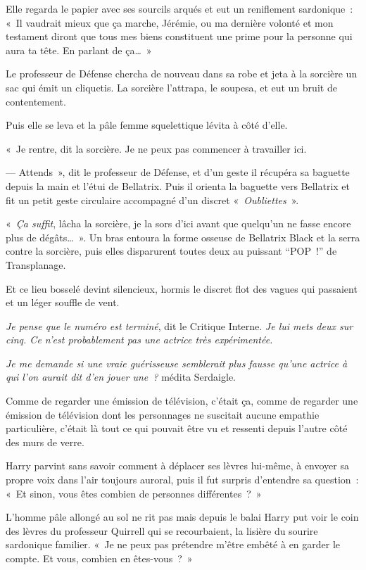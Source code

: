 Elle regarda le papier avec ses sourcils arqués et eut un reniflement sardonique~: «~Il vaudrait mieux que ça marche, Jérémie, ou ma dernière volonté et mon testament diront que tous mes biens constituent une prime pour la personne qui aura ta tête. En parlant de ça…~»

Le professeur de Défense chercha de nouveau dans sa robe et jeta à la sorcière un sac qui émit un cliquetis. La sorcière l'attrapa, le soupesa, et eut un bruit de contentement.

Puis elle se leva et la pâle femme squelettique lévita à côté d'elle.

«~Je rentre, dit la sorcière. Je ne peux pas commencer à travailler ici.

--- Attends~», dit le professeur de Défense, et d'un geste il récupéra sa baguette depuis la main et l'étui de Bellatrix. Puis il orienta la baguette vers Bellatrix et fit un petit geste circulaire accompagné d'un discret «~\emph{Oubliettes}~».

«~\emph{Ça suffit}, lâcha la sorcière, je la sors d'ici avant que quelqu'un ne fasse encore plus de dégâts…~». Un bras entoura la forme osseuse de Bellatrix Black et la serra contre la sorcière, puis elles disparurent toutes deux au puissant “POP~!” de Transplanage.

Et ce lieu bosselé devint silencieux, hormis le discret flot des vagues qui passaient et un léger souffle de vent.

\emph{Je pense que le numéro est terminé}, dit le Critique Interne. \emph{Je lui mets deux sur cinq. Ce n'est probablement pas une actrice très expérimentée.}

\emph{Je me demande si une vraie guérisseuse semblerait plus fausse qu'une actrice à qui l'on aurait dit d'en jouer une~?} médita Serdaigle.

Comme de regarder une émission de télévision, c'était ça, comme de regarder une émission de télévision dont les personnages ne suscitait aucune empathie particulière, c'était là tout ce qui pouvait être vu et ressenti depuis l'autre côté des murs de verre.

Harry parvint sans savoir comment à déplacer ses lèvres lui-même, à envoyer sa propre voix dans l'air toujours auroral, puis il fut surpris d'entendre sa question~: «~Et sinon, vous êtes combien de personnes différentes~?~»

L'homme pâle allongé au sol ne rit pas mais depuis le balai Harry put voir le coin des lèvres du professeur Quirrell qui se recourbaient, la lisière du sourire sardonique familier. «~Je ne peux pas prétendre m'être embêté à en garder le compte. Et vous, combien en êtes-vous~?~»

